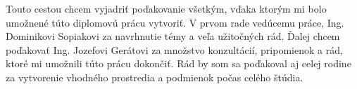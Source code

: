 Touto cestou chcem vyjadriť poďakovanie všetkým, vďaka ktorým mi bolo umožnené túto diplomovú prácu vytvoriť. V prvom rade vedúcemu práce, Ing. Dominikovi Sopiakovi za navrhnutie témy a veľa užitočných rád. Ďalej chcem poďakovať Ing. Jozefovi Gerátovi za množstvo konzultácií, pripomienok a rád, ktoré mi umožnili túto prácu dokončiť. Rád by som sa poďakoval aj celej rodine za vytvorenie vhodného prostredia a podmienok počas celého štúdia.